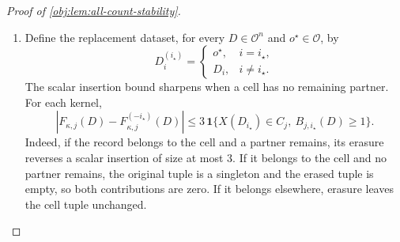 \begin{proof}[Proof of \cref{obj:lem:all-count-stability}]
\begin{enumerate}
The product law evaluates the event that all unreplaced records avoid cell \(j\), and the event that the old record is isolated in that cell, as
\[
\begin{aligned}
\Pr\{B_{j,i_\star}(D)=0\}
&=\prod_{i\ne i_\star}(1-p_j)
=(1-p_j)^{n-1},\\
\Pr\{X(D_{i_\star})\in C_j,\ B_{j,i_\star}(D)=0\}
&=p_j\prod_{i\ne i_\star}(1-p_j)
=p_j(1-p_j)^{n-1}.
\end{aligned}
\]
Subtracting the isolated-record event from the old record's cell-membership event yields
\[
\begin{aligned}
\Pr\{X(D_{i_\star})\in C_j,\ B_{j,i_\star}(D)\ge1\}
&=p_j-p_j(1-p_j)^{n-1}\\
&=p_j\bigl[1-(1-p_j)^{n-1}\bigr].
\end{aligned}
\]
For the independent replacement, the corresponding event is a product of its cell-membership event and the event that the unreplaced records have a partner. Hence
\[
\Pr\{X(o^\star)\in C_j,\ B_{j,i_\star}(D)\ge1\}
=p_j\bigl[1-(1-p_j)^{n-1}\bigr].
\]
These formulas include \(p_j=0\) and \(p_j=1\), since \(n-1\ge1\). Summing the cell indicators and using \(n>0\), we obtain
\[
\begin{aligned}
\mathbb E J_{i_\star}^{\mathrm{old}}
=\mathbb E J_{i_\star}^{\mathrm{new}}
&=\sum_{j=1}^k p_j\bigl[1-(1-p_j)^{n-1}\bigr]
=\frac{W(P)}n,\\
\mathbb E\bigl[J_{i_\star}^{\mathrm{old}}
+J_{i_\star}^{\mathrm{new}}\bigr]
&=\frac{2W(P)}n.
\end{aligned}
\]

\item Define the replacement dataset, for every \(D\in\mathcal O^n\) and \(o^\star\in\mathcal O\), by
\[
D_i^{(i_\star)}
=
\begin{cases}
o^\star,&i=i_\star,\\
D_i,&i\ne i_\star.
\end{cases}
\]
The scalar insertion bound sharpens when a cell has no remaining partner. For each kernel,
\[
\left|F_{\kappa,j}(D)-F_{\kappa,j}^{(-i_\star)}(D)\right|
\le
3\,\mathbf1\{X(D_{i_\star})\in C_j,\ B_{j,i_\star}(D)\ge1\}.
\]
Indeed, if the record belongs to the cell and a partner remains, its erasure reverses a scalar insertion of size at most \(3\). If it belongs to the cell and no partner remains, the original tuple is a singleton and the erased tuple is empty, so both contributions are zero. If it belongs elsewhere, erasure leaves the cell tuple unchanged.


\end{enumerate}
\end{proof}

